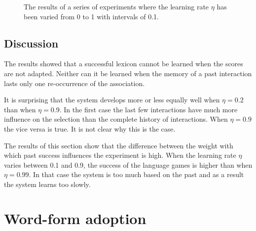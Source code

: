 \begin{figure}[p]
	\caption{The results of a series of experiments where the learning rate $\eta$ has been varied from 0 to 1 with intervals of 0.1.}
	\label{f:lex:A}
\end{figure}
\clearpage

\subsection{Discussion}

The results showed that a successful lexicon cannot be learned when the scores are not adapted. Neither can it be learned when the memory of a past interaction lasts only one re-occurrence of the association.

It is surprising that the system develops more or less equally well when $\eta=0.2$ than when $\eta=0.9$. In the first case the last few interactions have much more influence on the selection than the complete history of interactions. When $\eta=0.9$ the vice versa is true. It is not clear why this is the case.


The results of this section show that the difference between the weight with which past success influences the experiment is high. When the learning rate $\eta$ varies between 0.1 and 0.9, the success of the language games is higher than when $\eta=0.99$. In that case the system is too much based on the past and as a result the system learns too slowly.

\section{Word-form adoption}\label{s:par:adopt}

